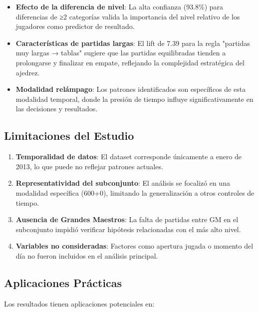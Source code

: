 \documentclass[runningheads]{llncs}
\begin{document}
\begin{itemize}
\item \textbf{Efecto de la diferencia de nivel}: La alta confianza (93.8\%) para diferencias de ≥2 categorías valida la importancia del nivel relativo de los jugadores como predictor de resultado.

\item \textbf{Características de partidas largas}: El lift de 7.39 para la regla "partidas muy largas → tablas" sugiere que las partidas equilibradas tienden a prolongarse y finalizar en empate, reflejando la complejidad estratégica del ajedrez.

\item \textbf{Modalidad relámpago}: Los patrones identificados son específicos de esta modalidad temporal, donde la presión de tiempo influye significativamente en las decisiones y resultados.
\end{itemize}

\subsection{Limitaciones del Estudio}

\begin{enumerate}
\item \textbf{Temporalidad de datos}: El dataset corresponde únicamente a enero de 2013, lo que puede no reflejar patrones actuales.

\item \textbf{Representatividad del subconjunto}: El análisis se focalizó en una modalidad específica (600+0), limitando la generalización a otros controles de tiempo.

\item \textbf{Ausencia de Grandes Maestros}: La falta de partidas entre GM en el subconjunto impidió verificar hipótesis relacionadas con el más alto nivel.

\item \textbf{Variables no consideradas}: Factores como apertura jugada o momento del día no fueron incluidos en el análisis principal.
\end{enumerate}

\subsection{Aplicaciones Prácticas}

Los resultados tienen aplicaciones potenciales en:
\end{document}
